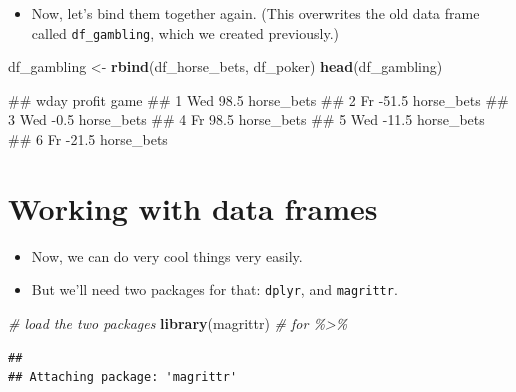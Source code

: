 \documentclass[
]{book}
\newenvironment{Shaded}{\begin{snugshade}}{\end{snugshade}}
\newcommand{\CommentTok}[1]{\textcolor[rgb]{0.56,0.35,0.01}{\textit{#1}}}
\newcommand{\FunctionTok}[1]{\textcolor[rgb]{0.13,0.29,0.53}{\textbf{#1}}}
\newcommand{\NormalTok}[1]{#1}
\newcommand{\OtherTok}[1]{\textcolor[rgb]{0.56,0.35,0.01}{#1}}
\providecommand{\tightlist}{%
  \setlength{\itemsep}{0pt}\setlength{\parskip}{0pt}}
\begin{document}
\begin{itemize}
\tightlist
\item
  Now, let's bind them together again. (This overwrites the old data frame called \texttt{df\_gambling}, which we created previously.)
\end{itemize}

\begin{Shaded}
\begin{Highlighting}[]
\NormalTok{df\_gambling }\OtherTok{\textless{}{-}} \FunctionTok{rbind}\NormalTok{(df\_horse\_bets, df\_poker)}
\FunctionTok{head}\NormalTok{(df\_gambling)}
\end{Highlighting}
\end{Shaded}

\begin{Shaded}
\begin{Highlighting}[]
\NormalTok{\#\#   wday profit       game}
\NormalTok{\#\# 1  Wed   98.5 horse\_bets}
\NormalTok{\#\# 2   Fr  {-}51.5 horse\_bets}
\NormalTok{\#\# 3  Wed   {-}0.5 horse\_bets}
\NormalTok{\#\# 4   Fr   98.5 horse\_bets}
\NormalTok{\#\# 5  Wed  {-}11.5 horse\_bets}
\NormalTok{\#\# 6   Fr  {-}21.5 horse\_bets}
\end{Highlighting}
\end{Shaded}

\section{Working with data frames}\label{working-with-data-frames}

\begin{itemize}
\tightlist
\item
  Now, we can do very cool things very easily.
\item
  But we'll need two packages for that: \texttt{dplyr}, and \texttt{magrittr}.
\end{itemize}

\begin{Shaded}
\begin{Highlighting}[]
\CommentTok{\# load the two packages}
\FunctionTok{library}\NormalTok{(magrittr) }\CommentTok{\# for \textquotesingle{}\%\textgreater{}\%\textquotesingle{}}
\end{Highlighting}
\end{Shaded}

\begin{verbatim}
## 
## Attaching package: 'magrittr'
\end{verbatim}
\end{document}
